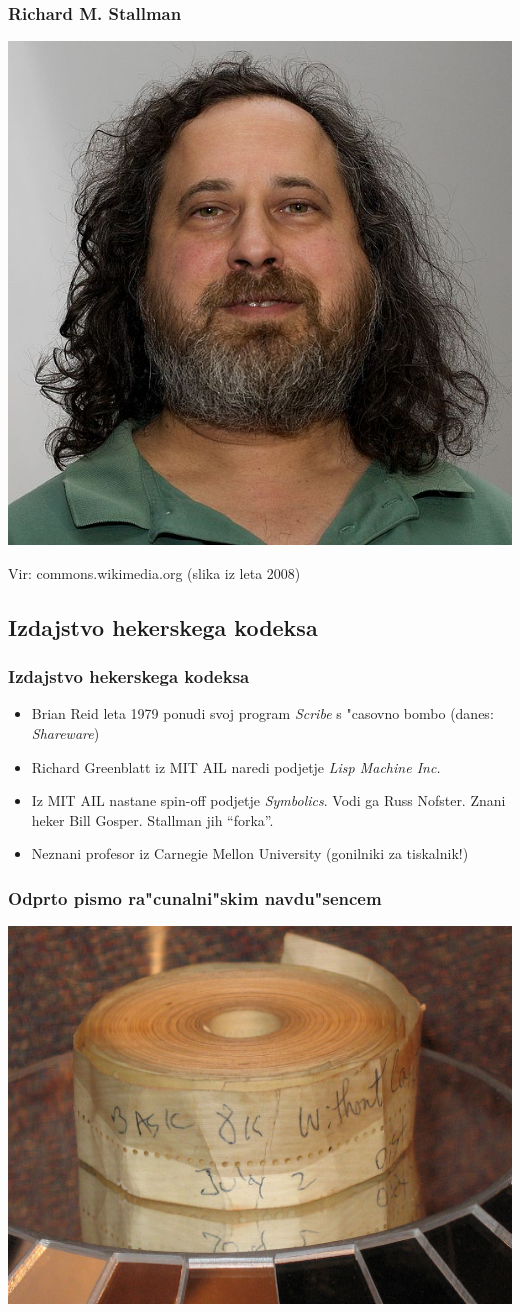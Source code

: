 \documentclass{beamer}
\newcommand{\vir}[1]{\tiny{Vir: #1}}
\begin{document}
\begin{frame}
\frametitle{Richard M. Stallman}
\begin{center}
\includegraphics[width=0.5\linewidth]{slike/RMS.jpg}
\end{center}
\vir{commons.wikimedia.org (slika iz leta 2008)}
\end{frame}


\subsection{Izdajstvo hekerskega kodeksa}
\begin{frame}
\frametitle{Izdajstvo hekerskega kodeksa}
\begin{itemize}
\item Brian Reid leta 1979 ponudi svoj program \textit{Scribe} s "casovno bombo (danes: \textit{Shareware})
\item Richard Greenblatt iz MIT AIL naredi podjetje \textit{Lisp Machine Inc.}
\item Iz MIT AIL nastane spin-off podjetje \textit{Symbolics}. Vodi ga Russ Nofster. Znani heker Bill Gosper. Stallman jih ``forka''.
\item Neznani profesor iz Carnegie Mellon University (gonilniki za tiskalnik!)
\end{itemize}
\end{frame}

\begin{frame}
\frametitle{Odprto pismo ra"cunalni"skim navdu"sencem}
\begin{center}
\includegraphics[width=0.6\linewidth]{slike/Altair_BASIC_Paper_Tape.jpg}
\end{center}
\end{frame}
\end{document}
